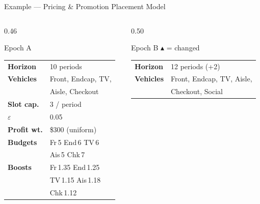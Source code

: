\documentclass[aspectratio=169,10pt]{beamer}
\begin{document}
\begin{frame}[t]{Example — Pricing \& Promotion Placement Model}
\vspace{1pt}
\vspace{4pt}
\begin{columns}[T]
  \begin{column}{0.46\textwidth}
    \begin{block}{\scriptsize Epoch A}
      \scriptsize
      \renewcommand{\arraystretch}{1.15}
      \begin{tabular}{@{}l@{\;\;}l@{}}
        \textbf{Horizon}       & 10 periods \\
        \textbf{Vehicles}      & Front, Endcap, TV, \\
                                & Aisle, Checkout \\
        \textbf{Slot cap.}     & 3 / period \\
        \textbf{$\varepsilon$} & 0.05 \\
        \textbf{Profit wt.}    & \$300 (uniform) \\
        \textbf{Budgets}       & Fr\,5\; End\,6\; TV\,6 \\
                                & Ais\,5\; Chk\,7 \\
        \textbf{Boosts}        & Fr\,1.35\; End\,1.25 \\
                                & TV\,1.15\; Ais\,1.18 \\
                                & Chk\,1.12 \\
      \end{tabular}
    \end{block}
  \end{column}
  \begin{column}{0.50\textwidth}
    \begin{block}{\scriptsize Epoch B \quad\textcolor{ared}{\scriptsize$\blacktriangle$ = changed}}
      \scriptsize
      \renewcommand{\arraystretch}{1.15}
      \begin{tabular}{@{}l@{\;\;}l@{}}
        \textbf{Horizon}       & \textcolor{ared}{12} periods \textcolor{ared}{\scriptsize(+2)} \\
        \textbf{Vehicles}      & Front, Endcap, TV, Aisle, \\
                                & Checkout, \textcolor{ared}{Social} \\

\end{tabular}
\end{block}
\end{column}
\end{columns}
\end{frame}
\end{document}
